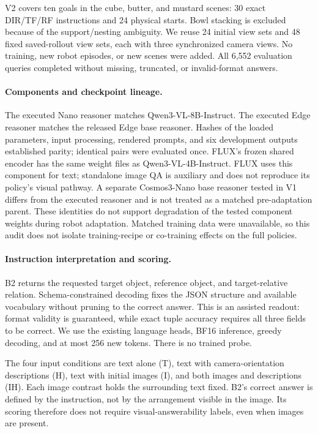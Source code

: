 \documentclass{article}
\begin{document}
V2 covers ten goals in the cube, butter, and mustard scenes: 30 exact DIR/TF/RF instructions and 24 physical starts. Bowl stacking is excluded because of the support/nesting ambiguity. We reuse 24 initial view sets and 48 fixed saved-rollout view sets, each with three synchronized camera views. No training, new robot episodes, or new scenes were added. All 6,552 evaluation queries completed without missing, truncated, or invalid-format answers.

\paragraph{Components and checkpoint lineage.}
The executed Nano reasoner matches Qwen3-VL-8B-Instruct. The executed Edge reasoner matches the released Edge base reasoner. Hashes of the loaded parameters, input processing, rendered prompts, and six development outputs established parity; identical pairs were evaluated once. FLUX's frozen shared encoder has the same weight files as Qwen3-VL-4B-Instruct. FLUX uses this component for text; standalone image QA is auxiliary and does not reproduce its policy's visual pathway. A separate Cosmos3-Nano base reasoner tested in V1 differs from the executed reasoner and is not treated as a matched pre-adaptation parent. These identities do not support degradation of the tested component weights during robot adaptation. Matched training data were unavailable, so this audit does not isolate training-recipe or co-training effects on the full policies.

\paragraph{Instruction interpretation and scoring.}
B2 returns the requested target object, reference object, and target-relative relation. Schema-constrained decoding fixes the JSON structure and available vocabulary without pruning to the correct answer. This is an assisted readout: format validity is guaranteed, while exact tuple accuracy requires all three fields to be correct. We use the existing language heads, BF16 inference, greedy decoding, and at most 256 new tokens. There is no trained probe.

The four input conditions are text alone (T), text with camera-orientation descriptions (H), text with initial images (I), and both images and descriptions (IH). Each image contrast holds the surrounding text fixed. B2's correct answer is defined by the instruction, not by the arrangement visible in the image. Its scoring therefore does not require visual-answerability labels, even when images are present.
\end{document}
